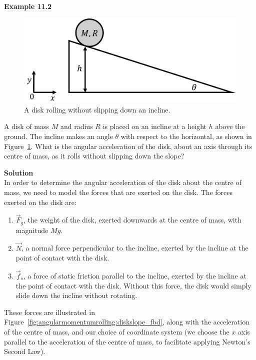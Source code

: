 \begin{framed}
\textbf{Example 11.2}\\
\begin{figure}[!htbp]
\centering
\includegraphics[width=0.5\linewidth]{files/diskslope-7e1ab66d6b3e0fd4d814dc76ee898212.png}
\caption[]{A disk rolling without slipping down an incline.}
\label{fig:angularmomentumrolling:diskslope2}
\end{figure}

A disk of mass $M$ and radius $R$ is placed on an incline at a height $h$ above the ground. The incline makes an angle $\theta$ with respect to the horizontal, as shown in Figure~\ref{fig:angularmomentumrolling:diskslope2}. What is the angular acceleration of the disk, about an axis through its centre of mass, as it rolls without slipping down the slope?

\begin{framed}
\textbf{Solution}\\
In order to determine the angular acceleration of the disk about the centre of mass, we need to model the forces that are exerted on the disk. The forces exerted on the disk are:

\begin{enumerate}
\item $\vec F_g$, the weight of the disk, exerted downwards at the centre of mass, with magnitude $Mg$.
\item $\vec N$, a normal force perpendicular to the incline, exerted by the incline at the point of contact with the disk.
\item $\vec f_s$, a force of static friction parallel to the incline, exerted by the incline at the point of contact with the disk. Without this force, the disk would simply slide down the incline without rotating.
\end{enumerate}

These forces are illustrated in Figure~\ref{fig:angularmomentumrolling:diskslope_fbd}, along with the acceleration of the centre of mass, and our choice of coordinate system (we choose the $x$ axis parallel to the acceleration of the centre of mass, to facilitate applying Newton's Second Law).


\end{framed}
\end{framed}
